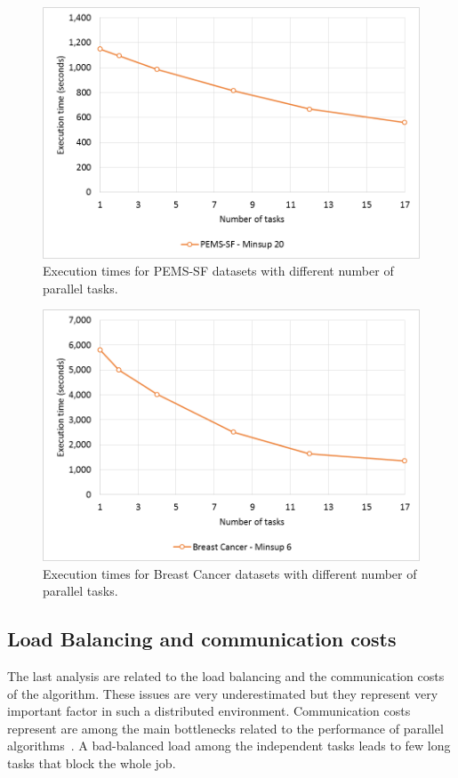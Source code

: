 \begin{figure}[!t]
\includegraphics[width=5in]{immagini_extension/scalability_pems.png}
\caption{Execution times for PEMS-SF datasets with different number of parallel tasks.}
\label{scalability_img_pems}
\end{figure}

\begin{figure}[!t]
\includegraphics[width=5in]{immagini_extension/scalability_breast.png}
\caption{Execution times for Breast Cancer datasets with different number of parallel tasks.}
\label{scalability_img_breast}
\end{figure}


\subsection{Load Balancing and communication costs}\label{communication_cost}
The last analysis are related to the load balancing and the communication costs of the algorithm. These issues are very underestimated but they represent very important factor in such a distributed environment. Communication costs represent are among the main bottlenecks related to the performance of parallel  algorithms~\cite{Sarma:2013:ULB:2535570.2488334}. 
A bad-balanced load among the independent tasks leads to few long tasks that block the whole job.


